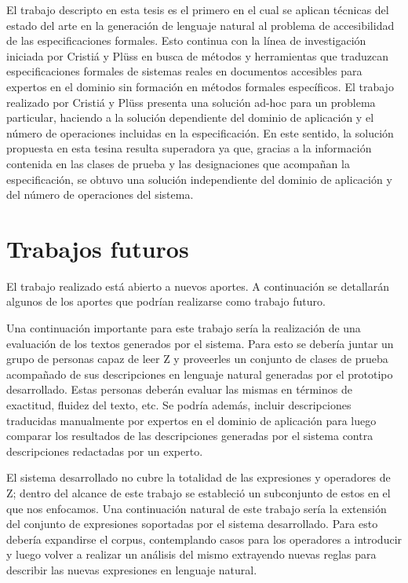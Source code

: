 El trabajo descripto en esta tesis es el primero en el cual se aplican técnicas del estado del arte en la generación de lenguaje natural al problema de accesibilidad de las especificaciones formales. Esto continua con la línea de investigación iniciada por Cristiá y Plüss \cite{cristia_pluss} en busca de métodos y herramientas que traduzcan especificaciones formales de sistemas reales en documentos accesibles para expertos en el dominio sin formación en métodos formales específicos. El trabajo realizado por Cristiá y Plüss \cite{cristia_pluss} presenta una solución ad-hoc para un problema particular, haciendo a la solución dependiente del dominio de aplicación y el número de operaciones incluidas en la especificación. En este sentido, la solución propuesta en esta tesina resulta superadora ya que, gracias a la información contenida en las clases de prueba y las designaciones que acompañan la especificación, se obtuvo una solución independiente del dominio de aplicación y del número de operaciones del sistema. 

\section*{Trabajos futuros}

El trabajo realizado está abierto a nuevos aportes. A continuación se detallarán algunos de los aportes que podrían realizarse como trabajo futuro.

Una continuación importante para este trabajo sería la realización de una evaluación de los textos generados por el sistema. Para esto se debería juntar un grupo de personas capaz de leer Z y proveerles un conjunto de clases de prueba acompañado de sus descripciones en lenguaje natural generadas por el prototipo desarrollado. Estas personas deberán evaluar las mismas en términos de exactitud, fluidez del texto, etc. Se podría además, incluir descripciones traducidas manualmente por expertos en el dominio de aplicación para luego comparar los resultados de las descripciones generadas por el sistema contra descripciones redactadas por un experto.

El sistema desarrollado no cubre la totalidad de las expresiones y operadores de Z; dentro del alcance de este trabajo se estableció un subconjunto de estos en el que nos enfocamos. Una continuación natural de este trabajo sería la extensión del conjunto de expresiones soportadas por el sistema desarrollado. Para esto debería expandirse el corpus, contemplando casos para los operadores a introducir y luego volver a realizar un análisis del mismo extrayendo nuevas reglas para describir las nuevas expresiones en lenguaje natural. 

